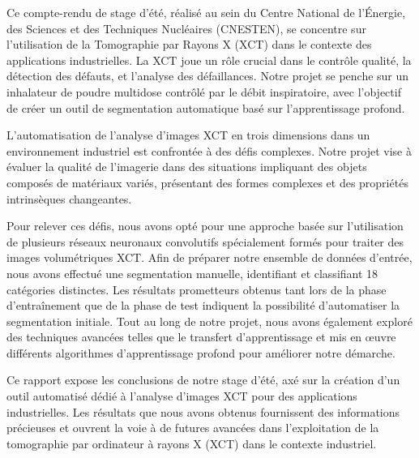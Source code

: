 \documentclass{report}
\newenvironment{mystyle}{
	\setlength{\parindent}{0pt} %
	\setlength{\parskip}{10pt} %
	\fontsize{12pt}{14pt}\selectfont %
}{
}
\begin{document}
	\vspace{0.5cm} %
	
	
	
	\begin{mystyle} 	Ce compte-rendu de stage d'été, réalisé au sein du Centre National de l'Énergie, des Sciences et des Techniques Nucléaires (CNESTEN), se concentre sur l'utilisation de la Tomographie par Rayons X (XCT) dans le contexte des applications industrielles. La XCT joue un rôle crucial dans le contrôle qualité, la détection des défauts, et l'analyse des défaillances. Notre projet se penche sur un inhalateur de poudre multidose contrôlé par le débit inspiratoire, avec l'objectif de créer un outil de segmentation automatique basé sur l'apprentissage profond.
		
		L'automatisation de l'analyse d'images XCT en trois dimensions dans un environnement industriel est confrontée à des défis complexes. Notre projet vise à évaluer la qualité de l'imagerie dans des situations impliquant des objets composés de matériaux variés, présentant des formes complexes et des propriétés intrinsèques changeantes.
		
		Pour relever ces défis, nous avons opté pour une approche basée sur l'utilisation de plusieurs réseaux neuronaux convolutifs spécialement formés pour traiter des images volumétriques XCT. Afin de préparer notre ensemble de données d'entrée, nous avons effectué une segmentation manuelle, identifiant et classifiant 18 catégories distinctes. Les résultats prometteurs obtenus tant lors de la phase d'entraînement que de la phase de test indiquent la possibilité d'automatiser la segmentation initiale. Tout au long de notre projet, nous avons également exploré des techniques avancées telles que le transfert d'apprentissage et mis en œuvre différents algorithmes d'apprentissage profond pour améliorer notre démarche.
		
		Ce rapport expose les conclusions de notre stage d'été, axé sur la création d'un outil automatisé dédié à l'analyse d'images XCT pour des applications industrielles. Les résultats que nous avons obtenus fournissent des informations précieuses et ouvrent la voie à de futures avancées dans l'exploitation de la tomographie par ordinateur à rayons X (XCT) dans le contexte industriel.
	\end{mystyle}
	
	
	\newpage  %
	
\end{document}
